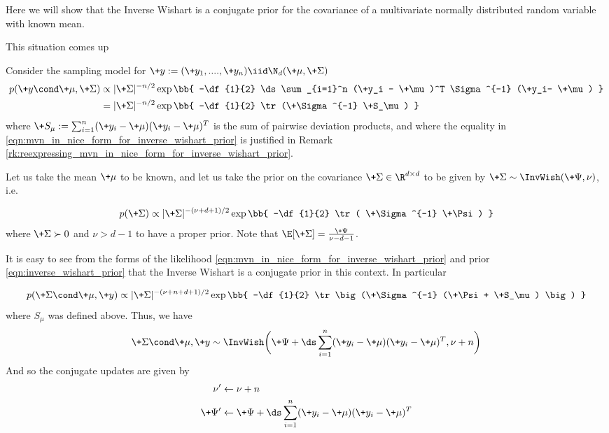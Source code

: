 \documentclass{article} %
\begin{document}
Here we will show that the Inverse Wishart is a conjugate prior for the covariance of a multivariate normally distributed random variable with known mean.

This situation comes up 

\begin{example}{} \label{ex:inverse_wishart_prior}



Consider the sampling model for $\+y :=(\+y_1, ....,\+y_n) \iid \N_d(\+\mu,  \+\Sigma)$
\begin{align}
p(\+y \cond \+\mu, \+\Sigma) & \propto | \+\Sigma |^{-n/2} \exp \bb{ -\df{1}{2} \ds\sum_{i=1}^n (\+y_i - \+\mu)^T  \Sigma^{-1} (\+y_i- \+\mu) } \nonumber \\
& = | \+\Sigma |^{-n/2} \exp \bb{ -\df{1}{2} \tr(\+\Sigma^{-1} \+S_\mu)  }\label{eqn:mvn_in_nice_form_for_inverse_wishart_prior}
\end{align}
where $\+S_\mu := \sum_{i=1}^n (\+y_i - \+\mu) (\+y_i - \+\mu)^T$ is the sum of pairwise deviation products,  and where the equality in \eqref{eqn:mvn_in_nice_form_for_inverse_wishart_prior}  is justified in Remark \ref{rk:reexpressing_mvn_in_nice_form_for_inverse_wishart_prior}.

Let us take the mean $\+\mu$ to be known,  and let us take the prior on the covariance $\+\Sigma \in \R^{d \times d}$ to be given by $\+\Sigma \sim \InvWish(\+\Psi, \nu)$, i.e.

\begin{align}
p(\+\Sigma) \propto | \+\Sigma|^{-(\nu+d +1) /2}  \exp \bb{ -\df{1}{2} \tr ( \+\Sigma^{-1} \+\Psi) } 
\label{eqn:inverse_wishart_prior}
\end{align}
where $\+\Sigma \succ 0$ and $\nu > d-1$ to have a proper prior.   Note that $\E[\+\Sigma] = \frac{\+\Psi}{\nu -d -1}$.

It is easy to see from the forms of the likelihood \eqref{eqn:mvn_in_nice_form_for_inverse_wishart_prior} and prior \eqref{eqn:inverse_wishart_prior} that the Inverse Wishart is a conjugate prior in this context.  In particular

\begin{align}
p(\+\Sigma \cond \+\mu,  \+y) \propto | \+\Sigma|^{-(\nu+ n + d +1) /2}  \exp \bb{ -\df{1}{2} \tr \big(\+\Sigma^{-1} (\+\Psi + \+S_\mu) \big) } 
\label{eqn:inverse_wishart_posterior}
\end{align}
where $S_\mu$ was defined above.  Thus,  we have 
\[ \+\Sigma \cond \+\mu,  \+y \sim \InvWish \bigg( \+\Psi +  \ds\sum_{i=1}^n (\+y_i - \+\mu) (\+y_i - \+\mu)^T,  \nu + n \bigg) \]
And so the conjugate updates are given by
\begin{align}
\nu^\prime &\leftarrow  \nu + n \\
\+\Psi^\prime &\leftarrow \+\Psi + \ds\sum_{i=1}^n (\+y_i - \+\mu) (\+y_i - \+\mu)^T
\end{align}
\end{example}
\end{document}
